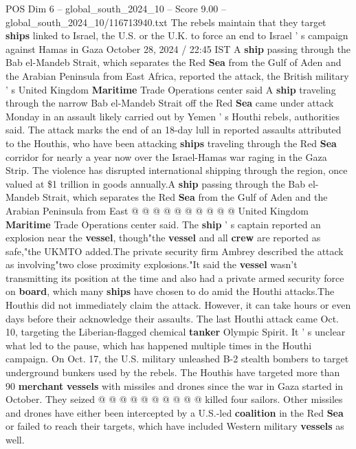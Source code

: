 \begin{textsample}{POS Dim 6 – global\_south\_2024\_10 – Score 9.00 – global\_south\_2024\_10/116713940.txt}  \label{ex:f6_pos_399}
The rebels maintain that they target \textbf{ships} linked to Israel, the U.S. or the U.K. to force an end to Israel ' s campaign against Hamas in Gaza October 28, 2024 / 22:45 IST A \textbf{ship} passing through the Bab el-Mandeb Strait, which separates the Red \textbf{Sea} from the Gulf of Aden and the Arabian Peninsula from East Africa, reported the attack, the British military ' s United Kingdom \textbf{Maritime} Trade Operations center said A \textbf{ship} traveling through the narrow Bab el-Mandeb Strait off the Red \textbf{Sea} came under attack Monday in an assault likely carried out by Yemen ' s Houthi rebels, authorities said.
The attack marks the end of an 18-day lull in reported assaults attributed to the Houthis, who have been attacking \textbf{ships} traveling through the Red \textbf{Sea} corridor for nearly a year now over the Israel-Hamas war raging in the Gaza Strip.
The violence has disrupted international shipping through the region, once valued at \$1 trillion in goods annually.A \textbf{ship} passing through the Bab el-Mandeb Strait, which separates the Red \textbf{Sea} from the Gulf of Aden and the Arabian Peninsula from East @ @ @ @ @ @ @ @ @ @ United Kingdom \textbf{Maritime} Trade Operations center said.
The \textbf{ship} ' s captain reported an explosion near the \textbf{vessel}, though"the \textbf{vessel} and all \textbf{crew} are reported as safe,"the UKMTO added.The private security firm Ambrey described the attack as involving"two close proximity explosions."It said the \textbf{vessel} wasn't transmitting its position at the time and also had a private armed security force on \textbf{board}, which many \textbf{ships} have chosen to do amid the Houthi attacks.The Houthis did not immediately claim the attack.
However, it can take hours or even days before their acknowledge their assaults.
The last Houthi attack came Oct. 10, targeting the Liberian-flagged chemical \textbf{tanker} Olympic Spirit.
It ' s unclear what led to the pause, which has happened multiple times in the Houthi campaign.
On Oct. 17, the U.S. military unleashed B-2 stealth bombers to target underground bunkers used by the rebels.
The Houthis have targeted more than 90 \textbf{merchant} \textbf{vessels} with missiles and drones since the war in Gaza started in October.
They seized @ @ @ @ @ @ @ @ @ @ killed four sailors.
Other missiles and drones have either been intercepted by a U.S.-led \textbf{coalition} in the Red \textbf{Sea} or failed to reach their targets, which have included Western military \textbf{vessels} as well.

\end{textsample}
